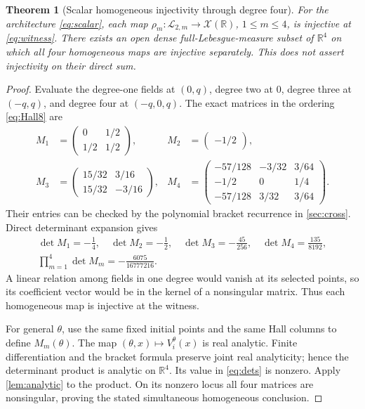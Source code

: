 \documentclass[11pt,a4paper]{article}
\numberwithin{equation}{section}
\newtheorem{theorem}{Theorem}[section]
\theoremstyle{definition}
\theoremstyle{remark}
\newcommand{\R}{\mathbb R}
\newcommand{\Lie}{\mathcal L}
\begin{document}
\begin{theorem}[Scalar homogeneous injectivity through degree four]
\label{thm:scalar}
For the architecture \eqref{eq:scalar}, each map
$\rho_m:\Lie_{2,m}\to\mathcal X(\R)$, $1\leq m\leq4$, is injective
at \eqref{eq:witness}. There exists an open dense full-Lebesgue-measure
subset of $\R^4$ on which all four homogeneous maps are injective
separately. This does not assert injectivity on their direct sum.
\end{theorem}
\begin{proof}
Evaluate the degree-one fields at $(0,q)$, degree two at $0$, degree three
at $(-q,q)$, and degree four at $(-q,0,q)$. The exact matrices in the
ordering \eqref{eq:Hall8} are
\begin{align}\label{eq:Ms}
 M_1&=\begin{pmatrix}0&1/2\\1/2&1/2\end{pmatrix},&
 M_2&=\begin{pmatrix}-1/2\end{pmatrix},\nonumber\\
 M_3&=\begin{pmatrix}15/32&3/16\\15/32&-3/16\end{pmatrix},&
 M_4&=\begin{pmatrix}
 -57/128&-3/32&3/64\\-1/2&0&1/4\\-57/128&3/32&3/64
 \end{pmatrix}.
\end{align}
Their entries can be checked by the polynomial bracket recurrence in
\cref{sec:cross}. Direct determinant expansion gives
\begin{equation}\label{eq:dets}
 \begin{gathered}
 \det M_1=-\frac14,\quad\det M_2=-\frac12,\quad
 \det M_3=-\frac{45}{256},\quad\det M_4=\frac{135}{8192},\\[4pt]
 \prod_{m=1}^4\det M_m=-\frac{6075}{16777216}.
 \end{gathered}
\end{equation}
A linear relation among fields in one degree would vanish at its selected
points, so its coefficient vector would be in the kernel of a nonsingular
matrix. Thus each homogeneous map is injective at the witness.

For general $\theta$, use the same fixed initial points and the same Hall
columns to define $M_m(\theta)$. The map $(\theta,x)\mapsto V_i^\theta(x)$
is real analytic. Finite differentiation and the bracket formula preserve
joint real analyticity; hence the determinant product is analytic on
$\R^4$. Its value in \eqref{eq:dets} is nonzero. Apply
\cref{lem:analytic} to the product. On its nonzero locus all four matrices
are nonsingular, proving the stated simultaneous homogeneous conclusion.
\end{proof}
\end{document}
